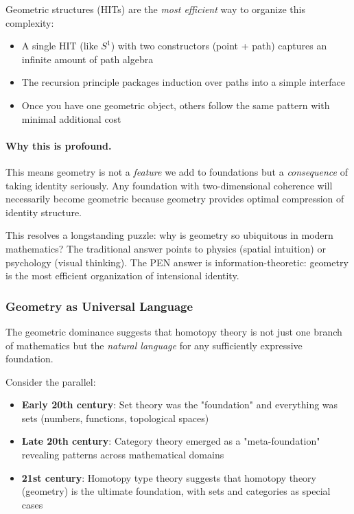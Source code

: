 \documentclass[11pt]{article}
\theoremstyle{definition}
\begin{document}
Geometric structures (HITs) are the \emph{most efficient} way to organize this complexity:

\begin{itemize}
\item A single HIT (like $S^1$) with two constructors (point + path) captures an infinite amount of path algebra
\item The recursion principle packages induction over paths into a simple interface
\item Once you have one geometric object, others follow the same pattern with minimal additional cost
\end{itemize}

\paragraph{Why this is profound.}

This means geometry is not a \emph{feature} we add to foundations but a \emph{consequence} of taking identity seriously. Any foundation with two-dimensional coherence will necessarily become geometric because geometry provides optimal compression of identity structure.

This resolves a longstanding puzzle: why is geometry so ubiquitous in modern mathematics? The traditional answer points to physics (spatial intuition) or psychology (visual thinking). The PEN answer is information-theoretic: geometry is the most efficient organization of intensional identity.

\subsubsection{Geometry as Universal Language}

The geometric dominance suggests that homotopy theory is not just one branch of mathematics but the \emph{natural language} for any sufficiently expressive foundation.

Consider the parallel:
\begin{itemize}
\item \textbf{Early 20th century}: Set theory was the "foundation" and everything was sets (numbers, functions, topological spaces)
\item \textbf{Late 20th century}: Category theory emerged as a "meta-foundation" revealing patterns across mathematical domains
\item \textbf{21st century}: Homotopy type theory suggests that homotopy theory (geometry) is the ultimate foundation, with sets and categories as special cases
\end{itemize}
\end{document}
